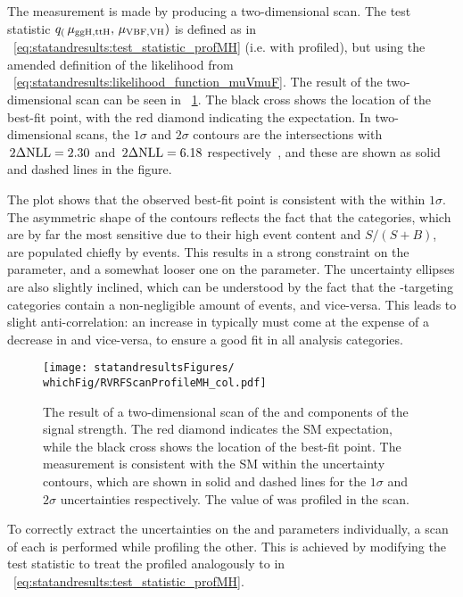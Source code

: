 The measurement is made by producing a two-dimensional \DNLL scan. The test statistic $q_(\,\mu_{\text{ggH},\text{ttH}},\,\mu_{\text{VBF},\text{VH}})$ is defined as in \Eq~\ref{eq:statandresults:test_statistic_profMH} (i.e. with \mH profiled), but using the amended definition of the likelihood from \Eq~\ref{eq:statandresults:likelihood_function_muVmuF}. 
The result of the two-dimensional scan can be seen in \Fig~\ref{fig:statandresults:mu_per_rvrf}. 
The black cross shows the location of the best-fit point, with the red diamond indicating the \SM expectation. In two-dimensional \DNLL scans, the $1\sigma$ and $2\sigma$ contours are the intersections with $\,2\Delta\text{NLL}=2.30$ and $\,2\Delta\text{NLL}=6.18$ respectively~\cite{Cowan}, and these are shown as solid and dashed lines in the figure. 

The plot shows that the observed best-fit point is consistent with the \SM within $1\sigma$. The asymmetric shape of the contours reflects the fact that the \Untagged categories, which are by far the most sensitive due to their high event content and $S/(S+B)$, are populated chiefly by \ggH events. This results in a strong constraint on the \muF parameter, and a somewhat looser one on the \muV parameter. The uncertainty ellipses are also slightly inclined, which can be understood by the fact that the \VBF-targeting categories contain a non-negligible amount of \ggH events, and vice-versa. This leads to slight anti-correlation: an increase in \muF typically must come at the expense of a decrease in \muV and vice-versa, to ensure a good fit in all analysis categories.


\begin{figure}[ht!]
\centering
\texttt{[image: statandresultsFigures/\\whichFig/RVRFScanProfileMH\_col.pdf]} 
\caption{The result of a two-dimensional \DNLL scan of the \muF and \muV components of the signal strength. The red diamond indicates the SM expectation, while the black cross shows the location of the best-fit point. The measurement is consistent with the SM within the uncertainty contours, which are shown in solid and dashed lines for the $1\sigma$ and $2\sigma$ uncertainties respectively. The value of \mH was profiled in the scan.}

\label{fig:statandresults:mu_per_rvrf}
\end{figure}

To correctly extract the uncertainties on  the \muF and \muV parameters individually, a \DNLL scan of each is performed while profiling the other. This is achieved by modifying the test statistic to treat the profiled \POI analogously to \mH in \Eq~\ref{eq:statandresults:test_statistic_profMH}. 

